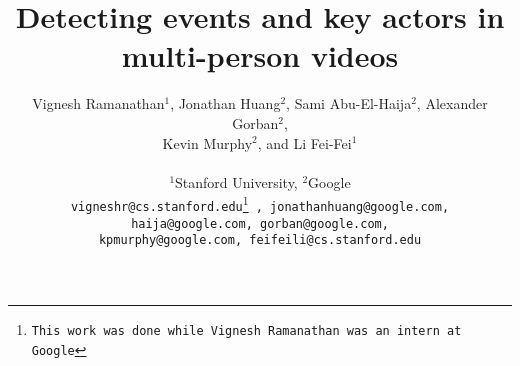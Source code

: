 \documentclass[10pt,twocolumn,letterpaper]{article}
\begin{document}
\title{Detecting events and key actors in multi-person videos}

\author{Vignesh Ramanathan$^{1}$, Jonathan Huang$^{2}$, Sami Abu-El-Haija$^{2}$,
  Alexander Gorban$^{2}$, \\
  Kevin Murphy$^{2}$,
  and Li Fei-Fei$^{1}$\\
  \\
  $^{1}$Stanford University, $^{2}$Google\\
{\tt\small vigneshr@cs.stanford.edu\thanks{This work was done while Vignesh Ramanathan was an intern at Google}
  , jonathanhuang@google.com, haija@google.com,
  gorban@google.com,}\\
  {\tt\small kpmurphy@google.com, feifeili@cs.stanford.edu}
}

\maketitle















{\small


}
\end{document}
